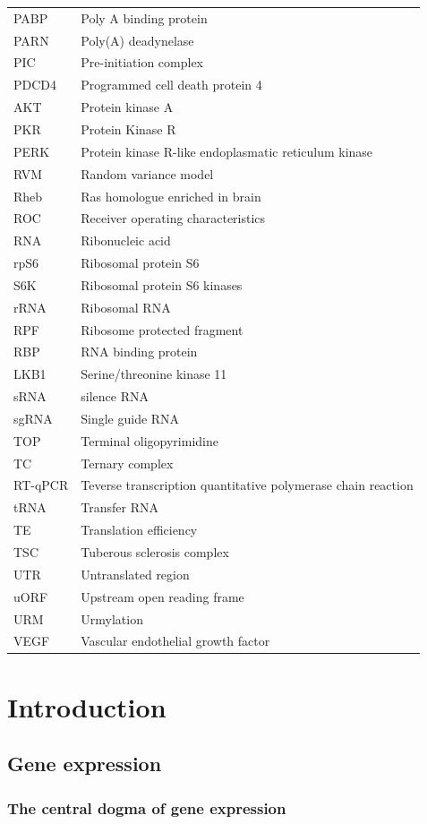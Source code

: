 \documentclass[12pt,openany]{book}
\begin{document}
\begin{longtable}{ll}
PABP & Poly A binding protein\\
PARN & Poly(A) deadynelase\\
PIC & Pre-initiation complex\\
\addlinespace
PDCD4 & Programmed cell death protein 4\\
AKT & Protein kinase A\\
PKR & Protein Kinase R\\
PERK & Protein kinase R-like endoplasmatic reticulum kinase\\
RVM & Random variance model\\
\addlinespace
Rheb & Ras homologue enriched in brain\\
ROC & Receiver operating characteristics\\
RNA & Ribonucleic acid\\
rpS6 & Ribosomal protein S6\\
S6K & Ribosomal protein S6 kinases\\
\addlinespace
rRNA & Ribosomal RNA\\
RPF & Ribosome protected fragment\\
RBP & RNA binding protein\\
LKB1 & Serine/threonine kinase 11\\
sRNA & silence RNA\\
\addlinespace
sgRNA & Single guide RNA\\
TOP & Terminal oligopyrimidine\\
TC & Ternary complex\\
RT-qPCR & Teverse transcription quantitative polymerase chain
reaction\\
tRNA & Transfer RNA\\
\addlinespace
TE & Translation efficiency\\
TSC & Tuberous sclerosis complex\\
UTR & Untranslated region\\
uORF & Upstream open reading frame\\
URM & Urmylation\\
\addlinespace
VEGF & Vascular endothelial growth factor\\*
\end{longtable}

\clearpage
{} \setcounter{page}{1}

\chapter{Introduction}\section{Gene expression}\subsection{The central dogma of gene expression}
\end{document}
